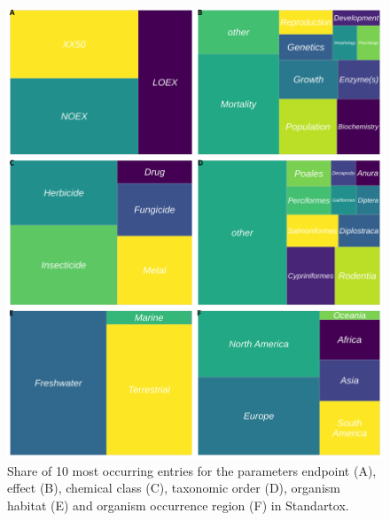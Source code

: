 \begin{figure}[h!]
    \includegraphics[width=1.0\textwidth]{article/figures/standartox_parameters.png}
    \caption{Share of 10 most occurring entries for the parameters endpoint (A), effect (B), chemical class (C), taxonomic order (D), organism habitat (E) and organism occurrence region (F) in Standartox.}
    \label{fig:stx-parameters}
\end{figure}

